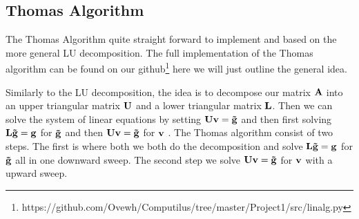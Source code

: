 \subsection*{Thomas Algorithm}
The Thomas Algorithm quite straight forward to implement and based on the more
general LU decomposition. The full implementation of the Thomas algorithm can be
found on our
github\footnote{https://github.com/Ovewh/Computilus/tree/master/Project1/src/linalg.py}
here we will just outline the general idea. \par Similarly to the LU
decomposition, the idea is to decompose our matrix $\mathbf{A}$ into an upper
triangular matrix $\mathbf{U}$ and a lower triangular matrix $\mathbf{L}$. Then we
can solve the system of linear equations by setting $\mathbf{U}\mathbf{v}=
\mathbf{\tilde{g}}$ and then first solving 
$\mathbf{L} \mathbf{\tilde{g}} = \mathbf{g}$ for $\mathbf{\tilde{g}}$ and then 
$\mathbf{U}\mathbf{v} = \mathbf{\tilde{g}}$ for $\mathbf{v}$
\cite{tridia}. The Thomas algorithm consist of two steps. The first is where
both we both do the decomposition and solve $\mathbf{L} \mathbf{\tilde{g}} =
\mathbf{g}$ for $\mathbf{\tilde{g}}$ all in one downward sweep. The second step we
solve $\mathbf{U}\mathbf{v} = \mathbf{\tilde{g}}$ for $\mathbf{v}$ with a upward sweep. 